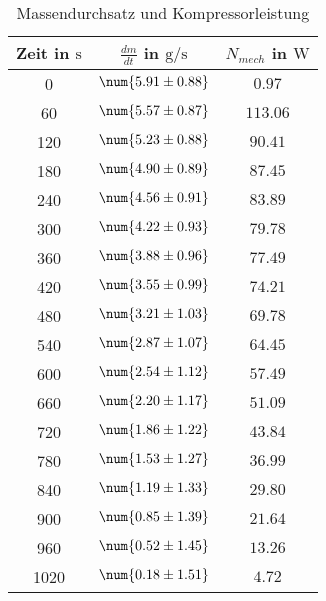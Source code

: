 \begin{table} 
 \centering 
 \begin{tabular}{S S S } 
 \toprule  
{Zeit in $\si{\second}$} & {$\frac{dm}{dt}$ in $\si{\gram \per \second}$} & {$N_{mech}$ in $\si{\watt}$}  \\ 
  & $\num{ 5.91 \pm 0.88 }$ & $\num{ 0.97  }$ \\ 
60  & $\num{ 5.57 \pm 0.87 }$ & $\num{ 113.06  }$ \\ 
120  & $\num{ 5.23 \pm 0.88 }$ & $\num{ 90.41  }$ \\ 
180  & $\num{ 4.90 \pm 0.89 }$ & $\num{ 87.45  }$ \\ 
240  & $\num{ 4.56 \pm 0.91 }$ & $\num{ 83.89  }$ \\ 
300  & $\num{ 4.22 \pm 0.93 }$ & $\num{ 79.78  }$ \\ 
360  & $\num{ 3.88 \pm 0.96 }$ & $\num{ 77.49  }$ \\ 
420  & $\num{ 3.55 \pm 0.99 }$ & $\num{ 74.21  }$ \\ 
480  & $\num{ 3.21 \pm 1.03 }$ & $\num{ 69.78  }$ \\ 
540  & $\num{ 2.87 \pm 1.07 }$ & $\num{ 64.45  }$ \\ 
600  & $\num{ 2.54 \pm 1.12 }$ & $\num{ 57.49  }$ \\ 
660  & $\num{ 2.20 \pm 1.17 }$ & $\num{ 51.09  }$ \\ 
720  & $\num{ 1.86 \pm 1.22 }$ & $\num{ 43.84  }$ \\ 
780  & $\num{ 1.53 \pm 1.27 }$ & $\num{ 36.99  }$ \\ 
840  & $\num{ 1.19 \pm 1.33 }$ & $\num{ 29.80  }$ \\ 
900  & $\num{ 0.85 \pm 1.39 }$ & $\num{ 21.64  }$ \\ 
960  & $\num{ 0.52 \pm 1.45 }$ & $\num{ 13.26  }$ \\ 
1020  & $\num{ 0.18 \pm 1.51 }$ & $\num{ 4.72  }$ \\ 
\bottomrule 
 \end{tabular} 
 \caption{Massendurchsatz und Kompressorleistung} 
 \label{tab: dmdtNmech} 
  \end{table}